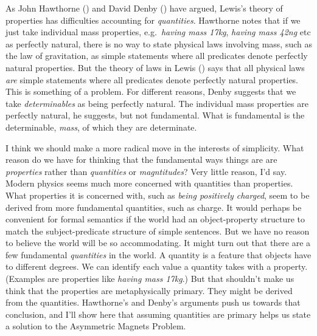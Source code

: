\documentclass[
  10pt,
  letterpaper,
  DIV=11,
  numbers=noendperiod,
  twoside]{scrartcl}
\begin{document}
As John Hawthorne () and David Denby
() have argued, Lewis's theory of
properties has difficulties accounting for \emph{quantities}. Hawthorne
notes that if we just take individual mass properties, e.g.~\emph{having
mass 17kg}, \emph{having mass 42ng} etc as perfectly natural, there is
no way to state physical laws involving mass, such as the law of
gravitation, as simple statements where all predicates denote perfectly
natural properties. But the theory of laws in Lewis
() says that all physical laws
\emph{are} simple statements where all predicates denote perfectly
natural properties. This is something of a problem. For different
reasons, Denby suggests that we take \emph{determinables} as being
perfectly natural. The individual mass properties are perfectly natural,
he suggests, but not fundamental. What is fundamental is the
determinable, \emph{mass}, of which they are determinate.

I think we should make a more radical move in the interests of
simplicity. What reason do we have for thinking that the fundamental
ways things are are \emph{properties} rather than \emph{quantities} or
\emph{magntitudes}? Very little reason, I'd say. Modern physics seems
much more concerned with quantities than properties. What properties it
is concerned with, such as \emph{being positively charged}, seem to be
derived from more fundamental quantities, such as charge. It would
perhaps be convenient for formal semantics if the world had an
object-property structure to match the subject-predicate structure of
simple sentences. But we have no reason to believe the world will be so
accommodating. It might turn out that there are a few fundamental
\emph{quantities} in the world. A quantity is a feature that objects
have to different degrees. We can identify each value a quantity takes
with a property. (Examples are properties like \emph{having mass 17kg}.)
But that shouldn't make us think that the properties are metaphysically
primary. They might be derived from the quantities. Hawthorne's and
Denby's arguments push us towards that conclusion, and I'll show here
that assuming quantities are primary helps us state a solution to the
Asymmetric Magnets Problem.
\end{document}
